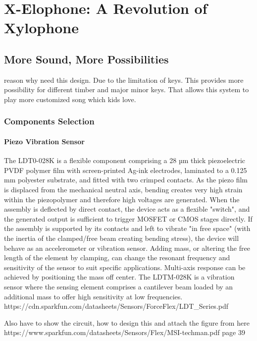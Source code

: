 \chapter{X-Elophone: A Revolution of Xylophone}
\section{More Sound, More Possibilities}
reason why need this design. Due to the limitation of keys. This provides more possibility for different timber and major minor keys. That allows this system to play more customized song which kids love.

\subsection{Components Selection}

\subsubsection{Piezo Vibration Sensor}
The LDT0-028K is a flexible component comprising a 28 µm thick piezoelectric PVDF
polymer film with screen-printed Ag-ink electrodes, laminated to a 0.125 mm polyester substrate, and fitted with two crimped contacts. As the piezo film is displaced from the mechanical neutral axis, bending creates very high strain within the piezopolymer and therefore high voltages are generated. When the assembly is deflected by direct contact, the device acts as a flexible "switch", and the generated output is sufficient to trigger MOSFET or CMOS stages directly. If the assembly is supported by its contacts and left to vibrate "in free space" (with the inertia of the clamped/free beam creating bending stress), the device will behave as an accelerometer or vibration sensor. Adding mass, or altering the free length of the element by clamping, can change the resonant frequency and sensitivity of the sensor to suit specific applications. Multi-axis response can be achieved by positioning the mass off center. The LDTM-028K is a vibration sensor where the sensing element comprises a cantilever beam loaded by an additional mass to offer high sensitivity at low frequencies. 
https://cdn.sparkfun.com/datasheets/Sensors/ForceFlex/LDT_Series.pdf

Also have to show the circuit, how to design this and attach the figure from here
https://www.sparkfun.com/datasheets/Sensors/Flex/MSI-techman.pdf
page 39

